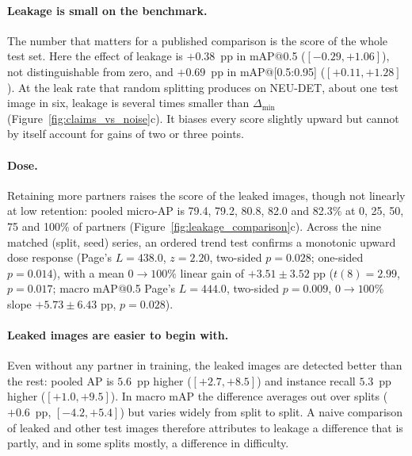 \documentclass[pdflatex,sn-apa]{sn-jnl}
\begin{document}
\paragraph{Leakage is small on the benchmark.} The number that matters for a published comparison is the score of the whole test set. Here the effect of leakage is $+0.38$~pp in mAP@0.5 ($[-0.29,+1.06]$), not distinguishable from zero, and $+0.69$~pp in mAP@[0.5:0.95] ($[+0.11,+1.28]$). At the leak rate that random splitting produces on NEU-DET, about one test image in six, leakage is several times smaller than $\Delta_{\min}$ (Figure~\ref{fig:claims_vs_noise}c). It biases every score slightly upward but cannot by itself account for gains of two or three points.

\paragraph{Dose.} Retaining more partners raises the score of the leaked images, though not linearly at low retention: pooled micro-AP is 79.4, 79.2, 80.8, 82.0 and 82.3\% at 0, 25, 50, 75 and 100\% of partners (Figure~\ref{fig:leakage_comparison}c). Across the nine matched (split, seed) series, an ordered trend test confirms a monotonic upward dose response (Page's $L=438.0$, $z=2.20$, two-sided $p=0.028$; one-sided $p=0.014$), with a mean $0 \to 100\%$ linear gain of $+3.51 \pm 3.52\text{ pp}$ ($t(8)=2.99$, $p=0.017$; macro mAP@0.5 Page's $L=444.0$, two-sided $p=0.009$, $0 \to 100\%$ slope $+5.73 \pm 6.43\text{ pp}$, $p=0.028$).

\paragraph{Leaked images are easier to begin with.} Even without any partner in training, the leaked images are detected better than the rest: pooled AP is $5.6$~pp higher ($[+2.7,+8.5]$) and instance recall $5.3$~pp higher ($[+1.0,+9.5]$). In macro mAP the difference averages out over splits ($+0.6$~pp, $[-4.2,+5.4]$) but varies widely from split to split. A naive comparison of leaked and other test images therefore attributes to leakage a difference that is partly, and in some splits mostly, a difference in difficulty.
\end{document}
